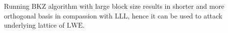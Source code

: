 Running $\mathrm{BKZ}$ algorithm with large block size results in shorter and more orthogonal basis in compassion with $\mathrm{LLL}$, hence it can be used to attack underlying lattice of $\mathrm{LWE}$.








